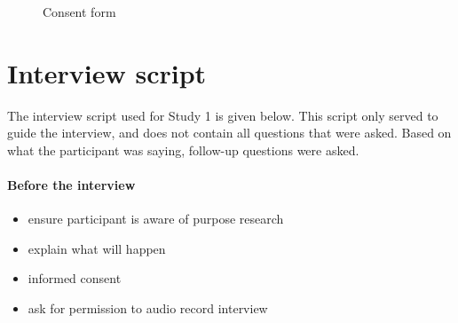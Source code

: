 \documentclass[11pt,oneside]{report}
\begin{document}
\begin{table}
\begin{figure}[htp] 
\caption{Consent form}
\label{fig:consentform}
\end{figure} 

\chapter{Interview script}\label{ch:interviewscript}
The interview script used for Study 1 is given below. This script only served to guide the interview, and does not contain all questions that were asked. Based on what the participant was saying, follow-up questions were asked. 

\subsubsection{Before the interview}
\begin{itemize}
\item 
ensure participant is aware of purpose research 
\item 
explain what will happen
\item 
informed consent
\item 
ask for permission to audio record interview
\end{itemize}

\end{table}
\end{document}
